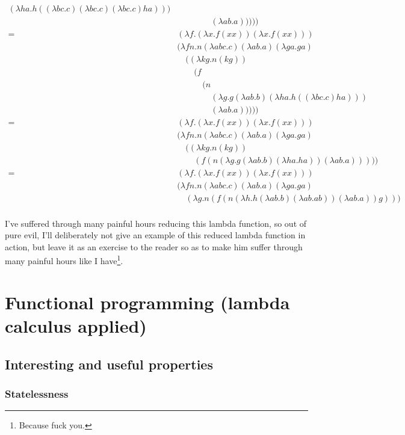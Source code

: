 \documentclass[11pt]{article}
\begin{document}
\begin{align*}
		(\lambda ha.h((\lambda bc.c)(\lambda bc.c)(\lambda bc.c)ha)))\\
	&\quad\quad\quad\quad(\lambda ab.a)))))\\
	=\ &(\lambda f.(\lambda x.f(xx))(\lambda x.f(xx)))\\
	&(\lambda fn.n(\lambda abc.c)(\lambda ab.a)(\lambda ga.ga)\\
	&\quad((\lambda kg.n(kg))\\
	&\quad\quad(f\\
	&\quad\quad\quad(n\\
	&\quad\quad\quad\quad(\lambda g.g(\lambda ab.b)(\lambda ha.h((\lambda bc.c)ha)))\\
	&\quad\quad\quad\quad(\lambda ab.a)))))\\
	=\ &(\lambda f.(\lambda x.f(xx))(\lambda x.f(xx)))\\
	&(\lambda fn.n(\lambda abc.c)(\lambda ab.a)(\lambda ga.ga)\\
	&\quad((\lambda kg.n(kg))\\
	&\quad\quad(f(n(\lambda g.g(\lambda ab.b)(\lambda ha.ha))(\lambda ab.a)))))\\
	=\ &(\lambda f.(\lambda x.f(xx))(\lambda x.f(xx)))\\
	&(\lambda fn.n(\lambda abc.c)(\lambda ab.a)(\lambda ga.ga)\\
	&\quad(\lambda g.n(f(n(\lambda h.h(\lambda ab.b)(\lambda ab.ab))(\lambda ab.a))g)))\\
\end{align*}
\endgroup

I've suffered through many painful hours reducing this lambda function, so out
of pure evil, I'll deliberately not give an example of this reduced lambda
function in action, but leave it as an exercise to the reader so as to make him
suffer through many painful hours like I have\footnote{Because fuck you.}.


\section{Functional programming (lambda calculus applied)}


\subsection{Interesting and useful properties}

\subsubsection{Statelessness}\label{statelessness}
\end{document}
